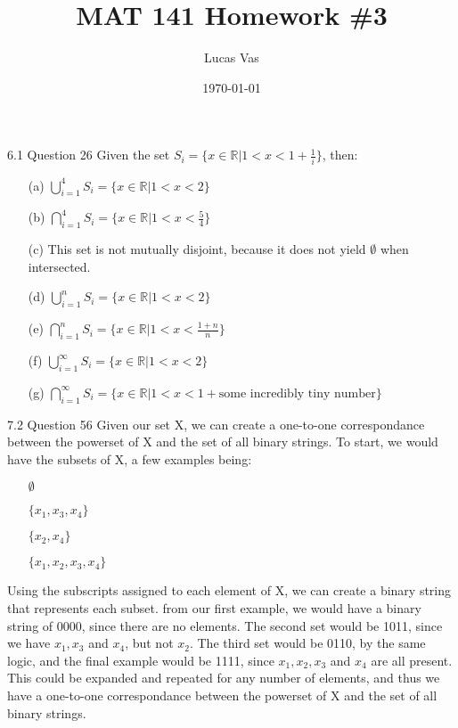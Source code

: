 \documentclass[12pt]{article}
\title{MAT 141 Homework \#3}
\author{Lucas Vas}
\date{\today}
\begin{document}
    \maketitle

    \begin{problem}{6.1 Question 26}
        Given the set $S_i = \{x \in \mathbb{R} | 1 < x < 1 + \frac{1}{i}\}$, then:
        \begin{itemize}
            \item[(a)] $\bigcup\limits_{i=1}^{4} S_i = \{x \in \mathbb{R} | 1 < x < 2\}$
            \item[(b)] $\bigcap\limits_{i=1}^{4} S_i = \{x \in \mathbb{R} | 1 < x < \frac{5}{4}\}$
            \item[(c)] This set is not mutually disjoint, because it does not yield $\emptyset$ when intersected.
            \item[(d)] $\bigcup\limits_{i=1}^{n} S_i = \{x \in \mathbb{R} | 1 < x < 2\}$
            \item[(e)] $\bigcap\limits_{i=1}^{n} S_i = \{x \in \mathbb{R} | 1 < x < \frac{1 + n}{n}\}$
            \item[(f)] $\bigcup\limits_{i=1}^{\infty} S_i = \{x \in \mathbb{R} | 1 < x < 2\}$
            \item[(g)] $\bigcap\limits_{i=1}^{\infty} S_i = \{x \in \mathbb{R} | 1 < x < 1 + \text{some incredibly tiny number}\}$
        \end{itemize}
    \end{problem}

    \begin{problem}{7.2 Question 56}
        Given our set X, we can create a one-to-one correspondance between the powerset of X and the set of
        all binary strings. To start, we would have the subsets of X, a few examples being:
        \begin{itemize}
            \item[] $\emptyset$
            \item[] $\{x_1, x_3, x_4\}$
            \item[] $\{x_2, x_4\}$
            \item[] $\{x_1, x_2, x_3, x_4\}$
        \end{itemize}
        Using the subscripts assigned to each element of X, we can create a binary string that represents each subset. from
        our first example, we would have a binary string of 0000, since there are no elements. The second set would be 1011,
        since we have $x_1, x_3$ and $x_4$, but not $x_2$. The third set would be 0110, by the same logic, and the final 
        example would be 1111, since $x_1, x_2, x_3$ and $x_4$ are all present. This could be expanded and repeated for any
        number of elements, and thus we have a one-to-one correspondance between the powerset of X and the set of all binary
        strings.
    \end{problem}
\end{document}
